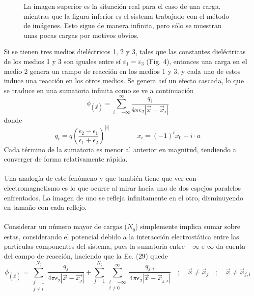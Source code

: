 \documentclass[12pt, notitlepage]{article}
\numberwithin{equation}{section}
\begin{document}
\begin{figure}[H]
\centering

\caption{La imagen superior es la situación real para el caso de una carga, mientras que la figura inferior es el sistema trabajado con el método de imágenes. Esto sigue de manera infinita, pero sólo se muestran unas pocas cargas por motivos obvios.}
\end{figure}

Si se tienen tres medios dieléctricos 1, 2 y 3, tales que las constantes dieléctricas de los medios 1 y 3 son iguales entre sí $\varepsilon_1 = \varepsilon_3$ (Fig. 4), entonces una carga en el medio 2 genera un campo de reacción en los medios 1 y 3, y cada uno de estos induce una reacción en los otros medios. Se genera así un efecto cascada, lo que se traduce en una sumatoria infinita \cite{Pei-kun} como se ve a continuación
\begin{equation}
\phi_{(\vec{x})} = \sum_{i=-\infty}^\infty\frac{q_i}{4\pi\epsilon_2|\vec{x} - \vec{x}_i|}
\end{equation}
donde
\begin{equation}
q_i = q\left(\frac{\epsilon_2 - \epsilon_1}{\epsilon_1 + \epsilon_2}\right)^{|i|} \qquad\qquad x_i=(-1)^ix_0 + i\cdot a
\end{equation}
Cada término de la sumatoria es menor al anterior en magnitud, tendiendo a converger de forma relativamente rápida.\\\\
Una analogía de este fenómeno y que también tiene que ver con electromagnetismo es lo que ocurre al mirar hacia uno de dos espejos paralelos enfrentados. La imagen de uno se refleja infinitamente en el otro, disminuyendo en tamaño con cada reflejo.\\\\
Considerar un número mayor de cargas ($N_q$) simplemente implica sumar sobre estas, considerando el potencial debido a la interacción electrostática entre las partículas componentes del sistema, pues la sumatoria entre $-\infty$ e $\infty$ da cuenta del campo de reacción, haciendo que la Ec. (29) quede
\begin{equation}
\phi_{(\vec{x})} = \sum_{\substack{j = 1\\j\neq i}}^{N_q} \frac{q_j}{4\pi\epsilon_2|\vec{x} - \vec{x_j}|} + \sum_{j=1}^{N_q}\sum_{\substack{i=-\infty\\i\neq 0}}^\infty\frac{q_{j,i}}{4\pi\epsilon_2|\vec{x} - \vec{x}_{j,i}|}\quad ; \quad \vec{x} \neq \vec{x}_j\quad ; \quad \vec{x} \neq \vec{x}_{j,i}
\end{equation}
\end{document}
